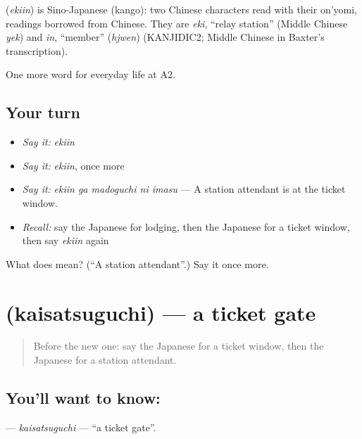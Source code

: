 \begin{cousinweb}
\textbf{} (\emph{ekiin}) is Sino-Japanese (kango): two Chinese characters read with their on'yomi, readings borrowed from Chinese. They are \emph{eki}, \textquotedblleft{}relay station\textquotedblright{} (Middle Chinese \emph{yek}) and \emph{in}, \textquotedblleft{}member\textquotedblright{} (\emph{hjwen}) (KANJIDIC2; Middle Chinese in Baxter's transcription).
\end{cousinweb}

\begin{grammarlens}[title={What you've built}]
One more word for everyday life at A2.
\end{grammarlens}

\subsection*{Your turn}
\begin{itemize}
\raggedright
  \item \emph{Say it:} \emph{ekiin}
  \item \emph{Say it:} \emph{ekiin}, once more
  \item \emph{Say it:} \emph{ekiin ga madoguchi ni imasu} — A station attendant is at the ticket window.
  \item \emph{Recall:} say the Japanese for lodging, then the Japanese for a ticket window, then say \emph{ekiin} again
\end{itemize}

\begin{tcolorbox}[breakable,colback=teal!4,colframe=teal!35!black,title={Before you move on}]
What does  mean? (\textquotedblleft{}A station attendant\textquotedblright{}.) Say it once more.
\end{tcolorbox}
\section[\texorpdfstring{\ja{かいさつぐち} (kaisatsuguchi)}{かいさつぐち (kaisatsuguchi)}]{ (kaisatsuguchi) — a ticket gate}

\label{lesson:JA-C205-kaisatsuguchi}



\begin{quote}
Before the new one: say the Japanese for a ticket window, then the Japanese for a station attendant.
\end{quote}

\subsection*{You'll want to know: }
\textbf{} — \emph{kaisatsuguchi} — \textquotedblleft{}a ticket gate\textquotedblright{}.

